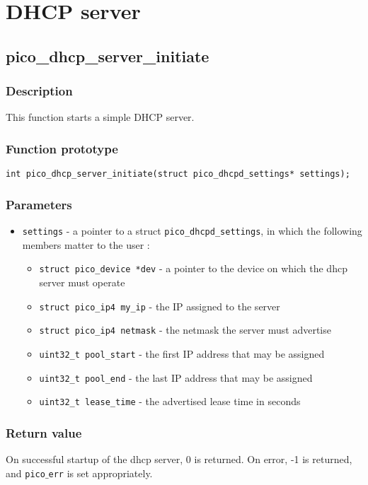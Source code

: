 \section{DHCP server}



\subsection{pico\_dhcp\_server\_initiate}

\subsubsection*{Description}
This function starts a simple DHCP server. 

\subsubsection*{Function prototype}
\texttt{int pico\_dhcp\_server\_initiate(struct pico\_dhcpd\_settings* settings);}

\subsubsection*{Parameters}
\begin{itemize}[noitemsep]
\item \texttt{settings} - a pointer to a struct \texttt{pico\_dhcpd\_settings}, in which the following members matter to the user : 
\begin{itemize}[noitemsep]
\item \texttt{struct pico\_device *dev} - a pointer to the device on which the dhcp server must operate
\item \texttt{struct pico\_ip4 my\_ip} - the IP assigned to the server
\item \texttt{struct pico\_ip4 netmask} - the netmask the server must advertise
\item \texttt{uint32\_t pool\_start} - the first IP address that may be assigned
\item \texttt{uint32\_t pool\_end} - the last IP address that may be assigned
\item \texttt{uint32\_t lease\_time} - the advertised lease time in seconds
\end{itemize}
\end{itemize}

\subsubsection*{Return value}
On successful startup of the dhcp server, 0 is returned.
On error, -1 is returned, and \texttt{pico$\_$err} is set appropriately.


